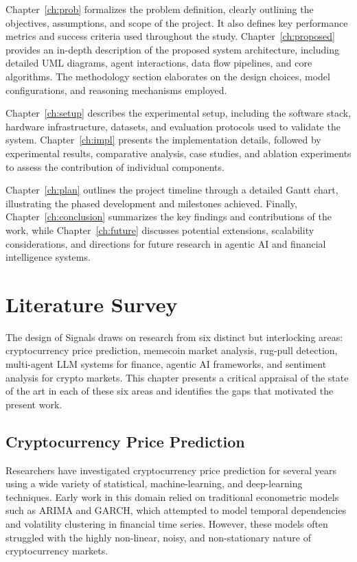 \documentclass[12pt,a4paper,oneside,openany]{book}
\begin{document}
Chapter~\ref{ch:prob} formalizes the problem definition, clearly outlining the objectives, assumptions, and scope of the project. It also defines key performance metrics and success criteria used throughout the study. Chapter~\ref{ch:proposed} provides an in-depth description of the proposed system architecture, including detailed UML diagrams, agent interactions, data flow pipelines, and core algorithms. The methodology section elaborates on the design choices, model configurations, and reasoning mechanisms employed.

Chapter~\ref{ch:setup} describes the experimental setup, including the software stack, hardware infrastructure, datasets, and evaluation protocols used to validate the system. Chapter~\ref{ch:impl} presents the implementation details, followed by experimental results, comparative analysis, case studies, and ablation experiments to assess the contribution of individual components.

Chapter~\ref{ch:plan} outlines the project timeline through a detailed Gantt chart, illustrating the phased development and milestones achieved. Finally, Chapter~\ref{ch:conclusion} summarizes the key findings and contributions of the work, while Chapter~\ref{ch:future} discusses potential extensions, scalability considerations, and directions for future research in agentic AI and financial intelligence systems.

\chapter{Literature Survey}
\label{ch:lit}

The design of Signals draws on research from six distinct but interlocking areas: cryptocurrency price prediction, memecoin market analysis, rug-pull detection, multi-agent LLM systems for finance, agentic AI frameworks, and sentiment analysis for crypto markets. This chapter presents a critical appraisal of the state of the art in each of these six areas and identifies the gaps that motivated the present work.

\section{Cryptocurrency Price Prediction}
Researchers have investigated cryptocurrency price prediction for several years using a wide variety of statistical, machine-learning, and deep-learning techniques. Early work in this domain relied on traditional econometric models such as ARIMA and GARCH, which attempted to model temporal dependencies and volatility clustering in financial time series. However, these models often struggled with the highly non-linear, noisy, and non-stationary nature of cryptocurrency markets.
\end{document}
